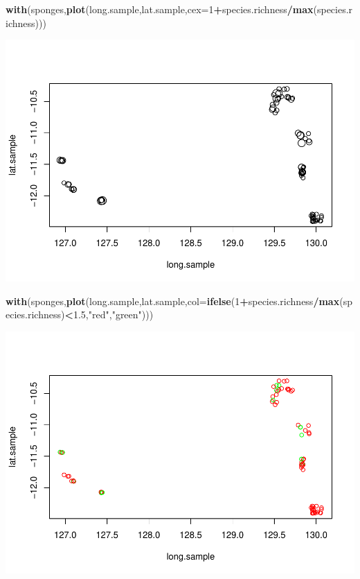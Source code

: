 \documentclass[
]{book}
\newenvironment{Shaded}{\begin{snugshade}}{\end{snugshade}}
\newcommand{\AttributeTok}[1]{\textcolor[rgb]{0.13,0.29,0.53}{#1}}
\newcommand{\DecValTok}[1]{\textcolor[rgb]{0.00,0.00,0.81}{#1}}
\newcommand{\FloatTok}[1]{\textcolor[rgb]{0.00,0.00,0.81}{#1}}
\newcommand{\FunctionTok}[1]{\textcolor[rgb]{0.13,0.29,0.53}{\textbf{#1}}}
\newcommand{\NormalTok}[1]{#1}
\newcommand{\SpecialCharTok}[1]{\textcolor[rgb]{0.81,0.36,0.00}{\textbf{#1}}}
\newcommand{\StringTok}[1]{\textcolor[rgb]{0.31,0.60,0.02}{#1}}
\begin{document}
\begin{Shaded}
\begin{Highlighting}[]
\FunctionTok{with}\NormalTok{(sponges,}\FunctionTok{plot}\NormalTok{(long.sample,lat.sample,}\AttributeTok{cex=}\DecValTok{1}\SpecialCharTok{+}\NormalTok{species.richness}\SpecialCharTok{/}\FunctionTok{max}\NormalTok{(species.richness))) }
\end{Highlighting}
\end{Shaded}

\includegraphics{ECOMODbook_files/figure-latex/unnamed-chunk-86-2.pdf}

\begin{Shaded}
\begin{Highlighting}[]
\FunctionTok{with}\NormalTok{(sponges,}\FunctionTok{plot}\NormalTok{(long.sample,lat.sample,}\AttributeTok{col=}\FunctionTok{ifelse}\NormalTok{(}\DecValTok{1}\SpecialCharTok{+}\NormalTok{species.richness}\SpecialCharTok{/}\FunctionTok{max}\NormalTok{(species.richness)}\SpecialCharTok{\textless{}}\FloatTok{1.5}\NormalTok{,}\StringTok{"red"}\NormalTok{,}\StringTok{"green"}\NormalTok{))) }
\end{Highlighting}
\end{Shaded}

\includegraphics{ECOMODbook_files/figure-latex/unnamed-chunk-86-3.pdf}
\end{document}
